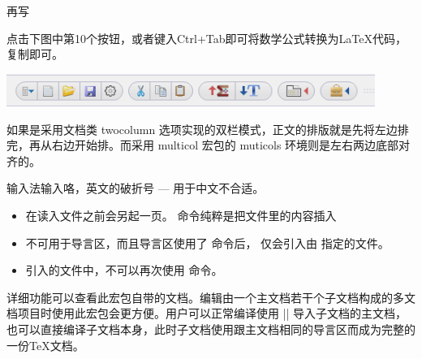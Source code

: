 再写
\begin{texlist}
  \usepackage{hyperref}
\end{texlist}



点击下图中第10个按钮，或者键入Ctrl+Tab即可将数学公式转换为\LaTeX{}代码，复制即可。

\includegraphics[width=0.9\textwidth]{../images/amxmath_texstudio}



如果是采用文档类 twocolumn 选项实现的双栏模式，正文的排版就是先将左边排完，再从右边开始排。而采用
multicol 宏包的 muticols 环境则是左右两边底部对齐的。



输入法输入咯，英文的破折号 --- 用于中文不合适。



\begin{itemize}
\item {} 在读入文件之前会另起一页。 命令纯粹是把文件里的内容插入
\item {} 不可用于导言区，而且导言区使用了  命令后，
   仅会引入由  指定的文件。
\item {} 引入的文件中，不可以再次使用  命令。
\end{itemize}



详细功能可以查看此宏包自带的文档。编辑由一个主文档若干个子文档构成的多文档项目时使用此宏包会更方便。用户可以正常编译使用
|| 导入子文档的主文档，也可以直接编译子文档本身，此时子文档使用跟主文档相同的导言区而成为完整的一份\TeX{}文档。












